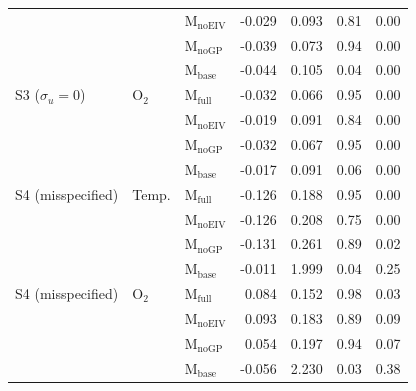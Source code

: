 \begin{table}[h!]
\begin{tabular}{lllrrrr}
     &  & $\mathrm{M_{noEIV}}$ & -0.029 & 0.093 & 0.81 & 0.00 \\
     &  & $\mathrm{M_{noGP}}$ & -0.039 & 0.073 & 0.94 & 0.00 \\
     &  & $\mathrm{M_{base}}$ & -0.044 & 0.105 & 0.04 & 0.00 \\
    \addlinespace
    S3 ($\sigma_u\!=\!0$) & O$_2$ & $\mathrm{M_{full}}$ & -0.032 & 0.066 & 0.95 & 0.00 \\
     &  & $\mathrm{M_{noEIV}}$ & -0.019 & 0.091 & 0.84 & 0.00 \\
     &  & $\mathrm{M_{noGP}}$ & -0.032 & 0.067 & 0.95 & 0.00 \\
     &  & $\mathrm{M_{base}}$ & -0.017 & 0.091 & 0.06 & 0.00 \\
    \addlinespace
    S4 (misspecified) & Temp. & $\mathrm{M_{full}}$ & -0.126 & 0.188 & 0.95 & 0.00 \\
     &  & $\mathrm{M_{noEIV}}$ & -0.126 & 0.208 & 0.75 & 0.00 \\
     &  & $\mathrm{M_{noGP}}$ & -0.131 & 0.261 & 0.89 & 0.02 \\
     &  & $\mathrm{M_{base}}$ & -0.011 & 1.999 & 0.04 & 0.25 \\
    \addlinespace
    S4 (misspecified) & O$_2$ & $\mathrm{M_{full}}$ & 0.084 & 0.152 & 0.98 & 0.03 \\
     &  & $\mathrm{M_{noEIV}}$ & 0.093 & 0.183 & 0.89 & 0.09 \\
     &  & $\mathrm{M_{noGP}}$ & 0.054 & 0.197 & 0.94 & 0.07 \\
     &  & $\mathrm{M_{base}}$ & -0.056 & 2.230 & 0.03 & 0.38 \\
    \bottomrule
  \end{tabular}
\end{table}
